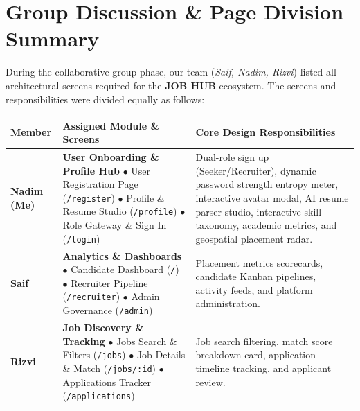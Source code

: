 \documentclass[11pt,a4paper]{article}
\begin{document}
\section{Group Discussion \& Page Division Summary}

During the collaborative group phase, our team (\textit{Saif, Nadim, Rizvi}) listed all architectural screens required for the \textbf{JOB HUB} ecosystem. The screens and responsibilities were divided equally as follows:

\vspace{0.8em}
\noindent
\begin{tabularx}{\textwidth}{@{} l p{2.2in} X @{}}
\toprule
\textbf{Member} & \textbf{Assigned Module \& Screens} & \textbf{Core Design Responsibilities} \\
\midrule
\textbf{Nadim (Me)} & 
\textbf{User Onboarding \& Profile Hub}\newline
$\bullet$ User Registration Page (\texttt{/register})\newline
$\bullet$ Profile \& Resume Studio (\texttt{/profile})\newline
$\bullet$ Role Gateway \& Sign In (\texttt{/login}) & 
Dual-role sign up (Seeker/Recruiter), dynamic password strength entropy meter, interactive avatar modal, AI resume parser studio, interactive skill taxonomy, academic metrics, and geospatial placement radar. \\
\addlinespace
\textbf{Saif} & 
\textbf{Analytics \& Dashboards}\newline
$\bullet$ Candidate Dashboard (\texttt{/})\newline
$\bullet$ Recruiter Pipeline (\texttt{/recruiter})\newline
$\bullet$ Admin Governance (\texttt{/admin}) & 
Placement metrics scorecards, candidate Kanban pipelines, activity feeds, and platform administration. \\
\addlinespace
\textbf{Rizvi} & 
\textbf{Job Discovery \& Tracking}\newline
$\bullet$ Jobs Search \& Filters (\texttt{/jobs})\newline
$\bullet$ Job Details \& Match (\texttt{/jobs/:id})\newline
$\bullet$ Applications Tracker (\texttt{/applications}) & 
Job search filtering, match score breakdown card, application timeline tracking, and applicant review. \\
\bottomrule
\end{tabularx}

\vspace{1.5em}
\end{document}
